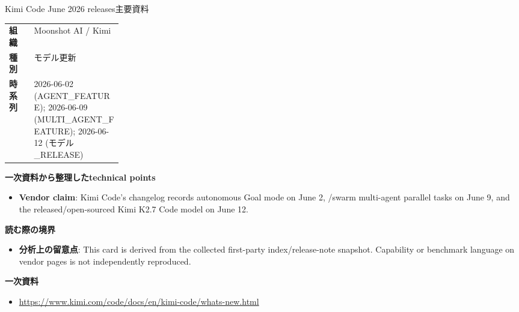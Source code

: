 \begin{technicalnote}{Kimi Code June 2026 releases}{主要資料}
\begin{tabularx}{\linewidth}{@{}>{\bfseries}p{0.22\linewidth}X@{}}
組織 & Moonshot AI / Kimi \\
種別 & モデル更新 \\
時系列 & 2026-06-02 (AGENT\_FEATURE); 2026-06-09 (MULTI\_AGENT\_FEATURE); 2026-06-12 (モデル\_RELEASE) \\
\end{tabularx}
\smallskip
{\bfseries 一次資料から整理したtechnical points}
\begin{itemize}[leftmargin=1.5em,itemsep=0.35em]
\item \textbf{Vendor claim}: Kimi Code's changelog records autonomous Goal mode on June 2, /swarm multi-agent parallel tasks on June 9, and the released/open-sourced Kimi K2.7 Code model on June 12.
\end{itemize}
{\bfseries 読む際の境界}
\begin{itemize}[leftmargin=1.5em,itemsep=0.35em]
\item \textbf{分析上の留意点}: This card is derived from the collected first-party index/release-note snapshot. Capability or benchmark language on vendor pages is not independently reproduced.
\end{itemize}
{\bfseries 一次資料}
\begingroup\sloppy
\begin{itemize}[leftmargin=1.5em,itemsep=0.25em]
\item {\scriptsize\url{https://www.kimi.com/code/docs/en/kimi-code/whats-new.html}}
\end{itemize}
\endgroup
\end{technicalnote}
\medskip

